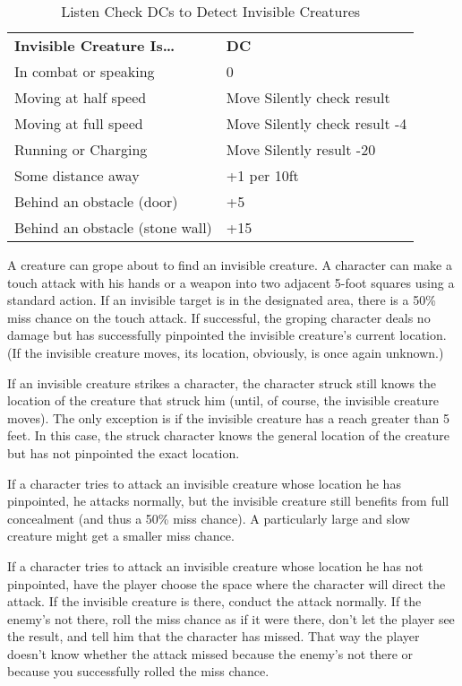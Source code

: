 \begin{table}[htb]
\mcinherit
\caption{Listen Check DCs to Detect Invisible Creatures}
\centering
\begin{tabular}{ll}
\textbf{Invisible Creature Is\ldots{}} & \textbf{DC}\\
In combat or speaking & 0\\
Moving at half speed & Move Silently check result\\
Moving at full speed & Move Silently check result -4\\
Running or Charging & Move Silently result -20\\
Some distance away & +1 per 10ft\\
Behind an obstacle (door) & +5\\
Behind an obstacle (stone wall) & +15\\
\end{tabular}
\end{table}

A creature can grope about to find an invisible creature. A character can make 
a touch attack with his hands or a weapon into two adjacent 5-foot squares using 
a standard action. If an invisible target is in the designated area, there is a 
50\% miss chance on the touch attack. If successful, the groping character deals 
no damage but has successfully pinpointed the invisible creature's current location. 
(If the invisible creature moves, its location, obviously, is once again unknown.)

If an invisible creature strikes a character, the character struck still knows 
the location of the creature that struck him (until, of course, the invisible creature 
moves). The only exception is if the invisible creature has a reach greater than 
5 feet. In this case, the struck character knows the general location of the creature 
but has not pinpointed the exact location.

If a character tries to attack an invisible creature whose location he has pinpointed, 
he attacks normally, but the invisible creature still benefits from full concealment 
(and thus a 50\% miss chance). A particularly large and slow creature might get 
a smaller miss chance.

If a character tries to attack an invisible creature whose location he has not 
pinpointed, have the player choose the space where the character will direct the 
attack. If the invisible creature is there, conduct the attack normally. If the 
enemy's not there, roll the miss chance as if it were there, don't let the player 
see the result, and tell him that the character has missed. That way the player 
doesn't know whether the attack missed because the enemy's not there or because 
you successfully rolled the miss chance.

